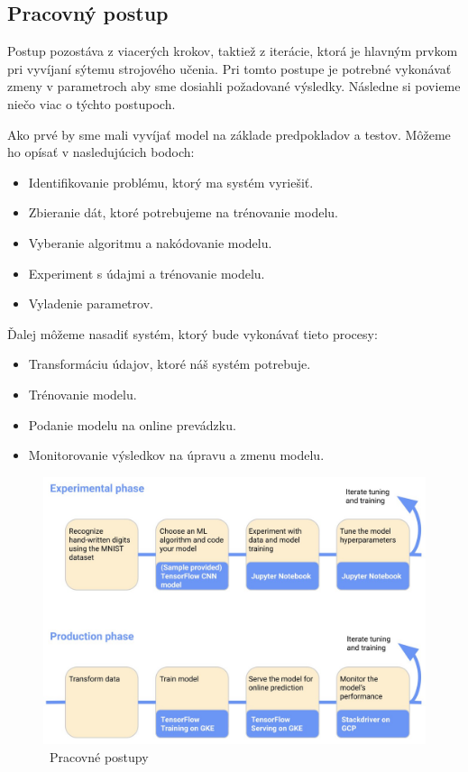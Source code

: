 \subsection{Pracovný postup}

Postup pozostáva z viacerých krokov, taktiež z iterácie, ktorá je hlavným prvkom pri vyvíjaní sýtemu strojového učenia. Pri tomto postupe je potrebné vykonávať zmeny v parametroch aby sme dosiahli požadované výsledky. Následne si povieme niečo viac o týchto postupoch.

Ako prvé by sme mali vyvíjať model na základe predpokladov a testov. Môžeme ho opísať v nasledujúcich bodoch:\cite{web}

\begin{itemize}
    \item Identifikovanie problému, ktorý ma systém vyriešiť.
    \item Zbieranie dát, ktoré potrebujeme na trénovanie modelu.
    \item Vyberanie algoritmu a nakódovanie modelu.
    \item Experiment s údajmi a trénovanie modelu.
	\item Vyladenie parametrov.
\end{itemize}

Ďalej môžeme nasadiť systém, ktorý bude vykonávať tieto procesy:

\begin{itemize}
    \item Transformáciu údajov, ktoré náš systém potrebuje.
	\item Trénovanie modelu.
	\item Podanie modelu na online prevádzku.
	\item Monitorovanie výsledkov na úpravu a zmenu modelu.
\end{itemize}

\begin{figure}[!ht]
    \includegraphics[width=.9\textwidth]{figures/kubeflowwork}
    \caption{\ Pracovné postupy \label{o:latex_friendly_zone}}
\end{figure}

